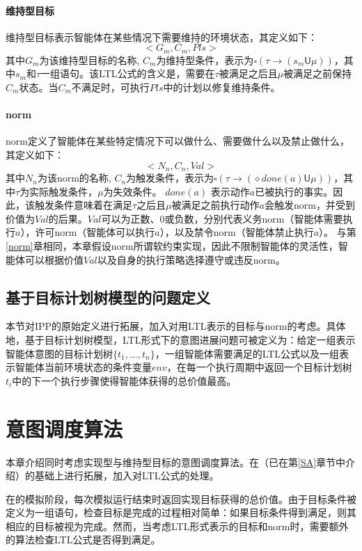 \paragraph{维持型目标}
维持型目标表示智能体在某些情况下需要维持的环境状态，其定义如下：
$$<G_m, C_m, Pls>$$
其中$G_m$为该维持型目标的名称, $C_m$为维持型条件，表示为$\square (\tau \rightarrow (s_m \mathsf{U} \mu))$，其中$s_m$和$\tau$一组语句。该LTL公式的含义是，需要在$\tau$被满足之后且$\mu$被满足之前保持$C_m$状态。当$C_m$不满足时，可执行$Pls$中的计划以修复维持条件。

\paragraph{norm}
norm定义了智能体在某些特定情况下可以做什么、需要做什么以及禁止做什么，其定义如下：
$$<N_n, C_n, Val>$$
其中$N_n$为该norm的名称, $C_n$为触发条件，表示为$\square (\tau \rightarrow ( \diamond done(a) \mathsf{U} \mu))$，其中$\tau$为实际触发条件，$\mu$为失效条件。 $done(a)$ 表示动作$a$已被执行的事实。因此，该触发条件意味着在满足$\tau$之后且$\mu$被满足之前执行动作$a$会触发norm，并受到价值为$Val$的后果。$Val$可以为正数、0或负数，分别代表义务norm（智能体需要执行$a$），许可norm（智能体可以执行$a$），以及禁令norm（智能体禁止执行$a$）。
与第\ref{norm}章相同，本章假设norm所谓软约束实现，因此不限制智能体的灵活性，智能体可以根据价值$Val$以及自身的执行策略选择遵守或违反norm。
\subsection{基于目标计划树模型的问题定义}
本节对IPP的原始定义进行拓展，加入对用LTL表示的目标与norm的考虑。具体地，基于目标计划树模型，LTL形式下的意图进展问题可被定义为：给定一组表示智能体意图的目标计划树$\{t_1, \dots, t_n\}$，一组智能体需要满足的LTL公式以及一组表示智能体当前环境状态的条件变量$env$，在每一个执行周期中返回一个目标计划树$t_i$中的下一个执行步骤使得智能体获得的总价值最高。
\section{\SAT 意图调度算法}
本章介绍同时考虑实现型与维持型目标的意图调度算法\SAT 。\SAT 在\SA（已在第\ref{SA}章节中介绍）的基础上进行拓展，加入对LTL公式的处理。

在\SA 的模拟阶段，每次模拟运行结束时返回实现目标获得的总价值。由于目标条件被定义为一组语句，检查目标是完成的过程相对简单：如果目标条件得到满足，则其相应的目标被视为完成。然而，当考虑LTL形式表示的目标和norm时，需要额外的算法检查LTL公式是否得到满足。

